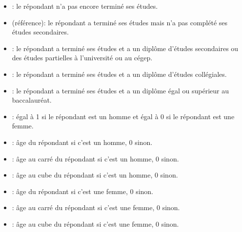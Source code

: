 \documentclass[letterpaper,10pt,french]{sphinxmanual}
\begin{document}
\begin{itemize}
\item {} 
: le répondant n’a pas encore terminé ses études.

\item {} 
 (référence): le répondant a terminé ses études mais n’a pas complété ses études secondaires.

\item {} 
: le répondant a terminé ses études et a un diplôme d’études secondaires ou des études partielles à l’université ou au cégep.

\item {} 
: le répondant a terminé ses études et a un diplôme d’études collégiales.

\item {} 
: le répondant a terminé ses études et a un diplôme égal ou supérieur au baccalauréat.

\end{itemize}


\begin{itemize}
\item {} 
: égal à 1 si le répondant est un homme et égal à 0 si le répondant est une femme.

\end{itemize}

\begin{itemize}
\item {} 
: âge du répondant si c’est un homme, 0 sinon.

\item {} 
: âge au carré du répondant si c’est un homme, 0 sinon.

\item {} 
: âge au cube du répondant si c’est un homme, 0 sinon.

\item {} 
: âge du répondant si c’est une femme, 0 sinon.

\item {} 
: âge au carré du répondant si c’est une femme, 0 sinon.

\item {} 
: âge au cube du répondant si c’est une femme, 0 sinon.

\end{itemize}
\end{document}
